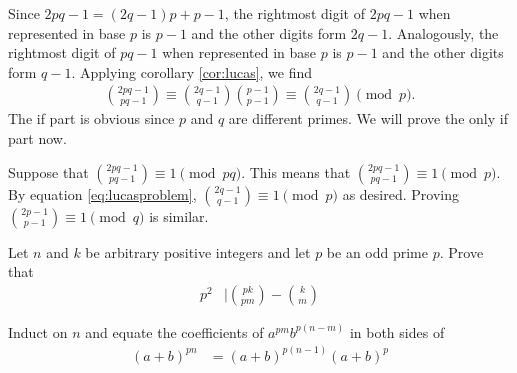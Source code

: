\documentclass[12pt]{subfile}
\begin{document}
	\begin{solution}
		Since $2pq-1 = (2q-1)p+p-1$, the rightmost digit of $2pq-1$ when represented in base $p$ is $p-1$ and the other digits form $2q-1$. Analogously, the rightmost digit of $pq-1$ when represented in base $p$ is $p-1$ and the other digits form $q-1$. Applying corollary \eqref{cor:lucas}, we find
			\begin{align}
				\binom{2pq-1}{pq-1}\equiv \binom{2q-1}{q-1} \binom{p-1}{p-1}\equiv \binom{2q-1}{q-1} \pmod p.\label{eq:lucasproblem}
			\end{align}
		The if part is obvious since $p$ and $q$ are different primes. We will prove the only if part now.

		Suppose  that $\binom{2pq-1}{pq-1}\equiv 1\pmod{pq}$. This means that $\binom{2pq-1}{pq-1}\equiv 1\pmod{p}$. By equation \eqref{eq:lucasproblem}, $\binom{2q-1}{q-1} \equiv 1 \pmod p$ as desired. Proving $\binom{2p-1}{p-1}\equiv 1 \pmod q$ is similar.
	\end{solution}

	\begin{problem}
		Let $n$ and $k$ be arbitrary positive integers and let $p$ be an odd prime $p$. Prove that
			\begin{align*}
				p^2
					& \mid \binom{pk}{pm} - \binom{k}{m}
			\end{align*}
	\end{problem}

	\begin{hint}
		Induct on $n$ and equate the coefficients of $a^{pm}b^{p(n-m)}$ in both sides of
			\begin{align*}
				(a+b)^{pn}
					& =(a+b)^{p(n-1)}(a+b)^{p}
			\end{align*}
	\end{hint}


%
\end{document}
